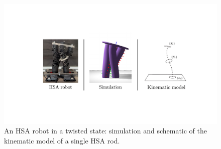 \begin{figure}
    \centering
    \includegraphics[width=0.72\columnwidth]{hsamodel/figures/overview/overview_v2_cropped.pdf}
    \caption{An HSA robot in a twisted state: simulation and schematic of the kinematic model of a single HSA rod.}
    \label{fig:hsamodel:overview}
\end{figure}



